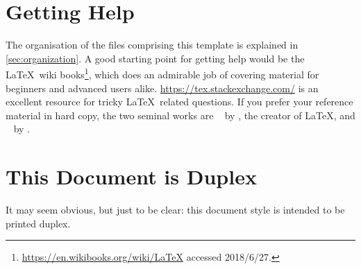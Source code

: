 \section*{Getting Help}
\label{sec:getting-help}
The organisation of the files comprising this template is explained in \autoref{sec:organization}.
A good starting point for getting help would be the \LaTeX\ wiki
books\footnote{\url{https://en.wikibooks.org/wiki/LaTeX} accessed 2018/6/27.}, which does
an admirable job of covering material for beginners and advanced users
alike.  \url{https://tex.stackexchange.com/} is an excellent resource
for tricky \LaTeX\ related questions. If you prefer your reference
material in hard copy, the two seminal works are ~\cite{Lamport1994:LADPSUGARM1994} by \citeauthor{Lamport1994:LADPSUGARM1994}, the creator of \LaTeX,
and ~\cite{Mittelbach2004:TLC2004}
by \citeauthor{Mittelbach2004:TLC2004}.

\section*{This Document is Duplex}
\label{sec:print-this-docum}

It may seem obvious, but just to be clear: this document style is intended to be printed duplex.


